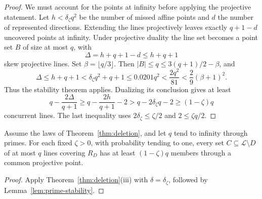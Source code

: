 \begin{proof}
We must account for the points at infinity before applying the
projective statement. Let $h<\delta_\zeta q^2$ be the number of missed
affine points and $d$ the
number of represented directions.  Extending the lines projectively
leaves exactly $q+1-d$ uncovered points at infinity.  Under projective
duality the line set becomes a point set $B$ of size at most $q$, with
\[
 \Delta=h+q+1-d\le h+q+1
\]
skew projective lines.  Set $\beta=\lfloor q/3\rfloor$.  Then
$|B|\le q\le3(q+1)/2-\beta$, and
\[
 \Delta\le h+q+1<\delta_\zeta q^2+q+1
 \le0.0201q^2<\frac{2q^2}{81}
 <\frac29(\beta+1)^2.
\]
Thus the stability theorem applies.  Dualizing its conclusion gives at
least
\[
 q-\frac{2\Delta}{q+1}
 \ge q-\frac{2h}{q+1}-2
 >q-2\delta_\zeta q-2
 \ge(1-\zeta)q
\]
concurrent lines.  The last inequality uses
$2\delta_\zeta\le\zeta/2$ and $2\le\zeta q/2$.
\end{proof}

\begin{corollary}\label{cor:core-pencil}
Assume the laws of Theorem~\ref{thm:deletion}, and let $q$ tend to infinity
through primes.  For each fixed $\zeta>0$, with probability tending to one,
every set $C\subseteq\mathcal L\setminus D$ of at most $q$ lines covering
$R_D$ has at least $(1-\zeta)q$ members through a common projective point.
\end{corollary}

\begin{proof}
Apply Theorem~\ref{thm:deletion}\textup{(iii)} with
$\delta=\delta_\zeta$, followed by Lemma~\ref{lem:prime-stability}.
\end{proof}
